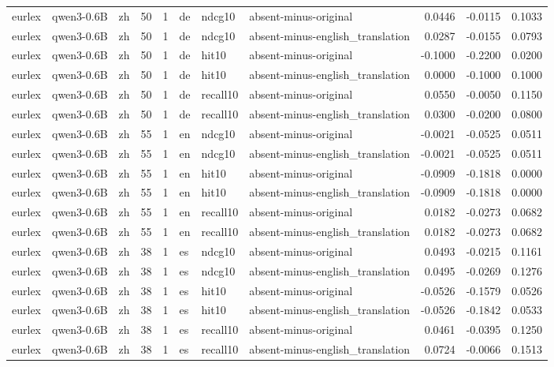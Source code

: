 \begin{tabular}{lllrrlllrrr}
eurlex & qwen3-0.6B & zh & 50 & 1 & de & ndcg10 & absent-minus-original & 0.0446 & -0.0115 & 0.1033 \\
eurlex & qwen3-0.6B & zh & 50 & 1 & de & ndcg10 & absent-minus-english\_translation & 0.0287 & -0.0155 & 0.0793 \\
eurlex & qwen3-0.6B & zh & 50 & 1 & de & hit10 & absent-minus-original & -0.1000 & -0.2200 & 0.0200 \\
eurlex & qwen3-0.6B & zh & 50 & 1 & de & hit10 & absent-minus-english\_translation & 0.0000 & -0.1000 & 0.1000 \\
eurlex & qwen3-0.6B & zh & 50 & 1 & de & recall10 & absent-minus-original & 0.0550 & -0.0050 & 0.1150 \\
eurlex & qwen3-0.6B & zh & 50 & 1 & de & recall10 & absent-minus-english\_translation & 0.0300 & -0.0200 & 0.0800 \\
eurlex & qwen3-0.6B & zh & 55 & 1 & en & ndcg10 & absent-minus-original & -0.0021 & -0.0525 & 0.0511 \\
eurlex & qwen3-0.6B & zh & 55 & 1 & en & ndcg10 & absent-minus-english\_translation & -0.0021 & -0.0525 & 0.0511 \\
eurlex & qwen3-0.6B & zh & 55 & 1 & en & hit10 & absent-minus-original & -0.0909 & -0.1818 & 0.0000 \\
eurlex & qwen3-0.6B & zh & 55 & 1 & en & hit10 & absent-minus-english\_translation & -0.0909 & -0.1818 & 0.0000 \\
eurlex & qwen3-0.6B & zh & 55 & 1 & en & recall10 & absent-minus-original & 0.0182 & -0.0273 & 0.0682 \\
eurlex & qwen3-0.6B & zh & 55 & 1 & en & recall10 & absent-minus-english\_translation & 0.0182 & -0.0273 & 0.0682 \\
eurlex & qwen3-0.6B & zh & 38 & 1 & es & ndcg10 & absent-minus-original & 0.0493 & -0.0215 & 0.1161 \\
eurlex & qwen3-0.6B & zh & 38 & 1 & es & ndcg10 & absent-minus-english\_translation & 0.0495 & -0.0269 & 0.1276 \\
eurlex & qwen3-0.6B & zh & 38 & 1 & es & hit10 & absent-minus-original & -0.0526 & -0.1579 & 0.0526 \\
eurlex & qwen3-0.6B & zh & 38 & 1 & es & hit10 & absent-minus-english\_translation & -0.0526 & -0.1842 & 0.0533 \\
eurlex & qwen3-0.6B & zh & 38 & 1 & es & recall10 & absent-minus-original & 0.0461 & -0.0395 & 0.1250 \\
eurlex & qwen3-0.6B & zh & 38 & 1 & es & recall10 & absent-minus-english\_translation & 0.0724 & -0.0066 & 0.1513 \\

\end{tabular}
